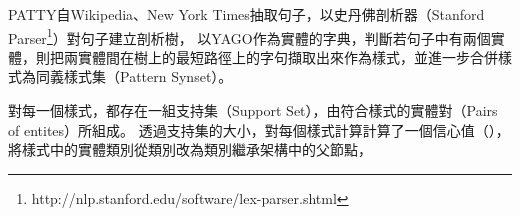 PATTY自Wikipedia、New York Times抽取句子，以史丹佛剖析器（Stanford Parser\footnote{http://nlp.stanford.edu/software/lex-parser.shtml}）對句子建立剖析樹，
以YAGO作為實體的字典，判斷若句子中有兩個實體，則把兩實體間在樹上的最短路徑上的字句擷取出來作為樣式，並進一步合併樣式為同義樣式集（Pattern Synset）。

對每一個樣式，都存在一組支持集（Support Set），由符合樣式的實體對（Pairs of entites）所組成。
透過支持集的大小，對每個樣式計算計算了一個信心值（），將樣式中的實體類別從類別改為類別繼承架構中的父節點，




%
%

